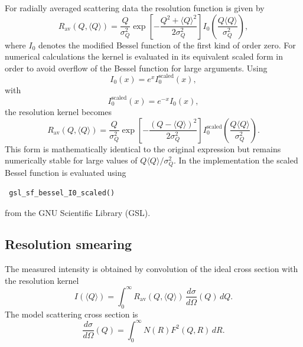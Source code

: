For radially averaged scattering data the resolution function is given by 
\begin{equation} 
R_{\mathrm{av}} \left( Q,\langle Q\rangle \right) = \frac{Q}{\sigma_Q^2} \exp \left[ -\frac{ Q^2+\langle Q\rangle^2 } {2\sigma_Q^2} \right] I_0 \left( \frac{ Q\langle Q\rangle } {\sigma_Q^2} \right), 
\end{equation} 
where $I_0$ denotes the modified Bessel function of the first kind of order zero. For numerical calculations the kernel is evaluated in its equivalent scaled form in order to avoid overflow of the Bessel function for large arguments. Using 
\begin{equation} 
I_0(x) = e^{x} I_0^{\mathrm{scaled}}(x), 
\end{equation} 
with 
\begin{equation} 
I_0^{\mathrm{scaled}}(x) = e^{-x}I_0(x), 
\end{equation} 
the resolution kernel becomes 
\begin{equation} 
R_{\mathrm{av}} \left( Q,\langle Q\rangle \right) = \frac{Q}{\sigma_Q^2} \exp \left[ -\frac{ \left( Q-\langle Q\rangle \right)^2 } {2\sigma_Q^2} \right] I_0^{\mathrm{scaled}} \left( \frac{ Q\langle Q\rangle } {\sigma_Q^2} \right). 
\end{equation} 
This form is mathematically identical to the original expression but remains numerically stable for large values of $Q\langle Q\rangle/\sigma_Q^2$. In the implementation the scaled Bessel function is evaluated using \begin{verbatim} gsl_sf_bessel_I0_scaled() \end{verbatim} from the GNU Scientific Library (GSL).

\subsection{Resolution smearing} 

The measured intensity is obtained by convolution of the ideal cross section with the resolution kernel 
\begin{equation} 
I(\langle Q\rangle) = \int_0^\infty R_{\mathrm{av}} \left( Q,\langle Q\rangle \right) \, \frac{d\sigma}{d\Omega}(Q) \, dQ. 
\end{equation} 
The model scattering cross section is 
\begin{equation} 
\frac{d\sigma}{d\Omega}(Q) = \int_0^\infty N(R) F^2(Q,R) \, dR. 
\end{equation}


